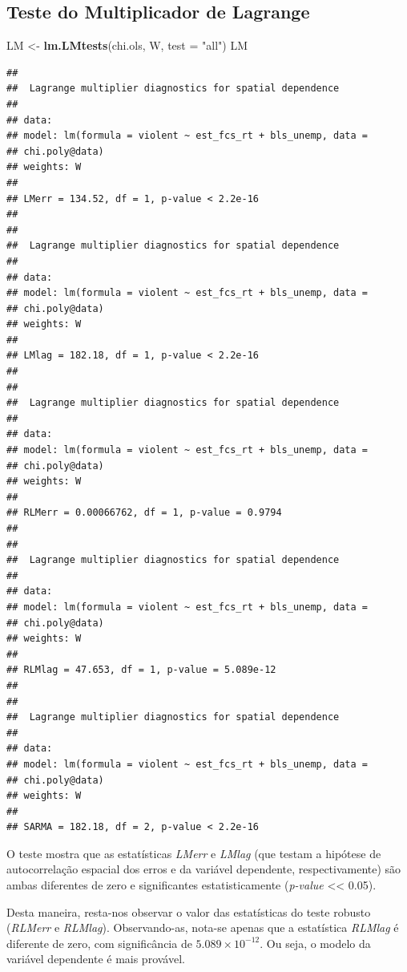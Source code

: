 \documentclass[12pt,]{article}
\newenvironment{Shaded}{\begin{snugshade}}{\end{snugshade}}
\newcommand{\KeywordTok}[1]{\textcolor[rgb]{0.13,0.29,0.53}{\textbf{#1}}}
\newcommand{\DataTypeTok}[1]{\textcolor[rgb]{0.13,0.29,0.53}{#1}}
\newcommand{\StringTok}[1]{\textcolor[rgb]{0.31,0.60,0.02}{#1}}
\newcommand{\NormalTok}[1]{#1}
\begin{document}
\subsection{Teste do Multiplicador de
Lagrange}\label{teste-do-multiplicador-de-lagrange-1}

\begin{Shaded}
\begin{Highlighting}[]
\NormalTok{LM <-}\StringTok{ }\KeywordTok{lm.LMtests}\NormalTok{(chi.ols, W, }\DataTypeTok{test =} \StringTok{"all"}\NormalTok{)}
\NormalTok{LM}
\end{Highlighting}
\end{Shaded}

\begin{verbatim}
## 
##  Lagrange multiplier diagnostics for spatial dependence
## 
## data:  
## model: lm(formula = violent ~ est_fcs_rt + bls_unemp, data =
## chi.poly@data)
## weights: W
## 
## LMerr = 134.52, df = 1, p-value < 2.2e-16
## 
## 
##  Lagrange multiplier diagnostics for spatial dependence
## 
## data:  
## model: lm(formula = violent ~ est_fcs_rt + bls_unemp, data =
## chi.poly@data)
## weights: W
## 
## LMlag = 182.18, df = 1, p-value < 2.2e-16
## 
## 
##  Lagrange multiplier diagnostics for spatial dependence
## 
## data:  
## model: lm(formula = violent ~ est_fcs_rt + bls_unemp, data =
## chi.poly@data)
## weights: W
## 
## RLMerr = 0.00066762, df = 1, p-value = 0.9794
## 
## 
##  Lagrange multiplier diagnostics for spatial dependence
## 
## data:  
## model: lm(formula = violent ~ est_fcs_rt + bls_unemp, data =
## chi.poly@data)
## weights: W
## 
## RLMlag = 47.653, df = 1, p-value = 5.089e-12
## 
## 
##  Lagrange multiplier diagnostics for spatial dependence
## 
## data:  
## model: lm(formula = violent ~ est_fcs_rt + bls_unemp, data =
## chi.poly@data)
## weights: W
## 
## SARMA = 182.18, df = 2, p-value < 2.2e-16
\end{verbatim}

O teste mostra que as estatísticas \emph{LMerr} e \emph{LMlag} (que
testam a hipótese de autocorrelação espacial dos erros e da variável
dependente, respectivamente) são ambas diferentes de zero e
significantes estatisticamente (\emph{p-value} \textless{}\textless{}
0.05).

Desta maneira, resta-nos observar o valor das estatísticas do teste
robusto (\emph{RLMerr} e \emph{RLMlag}). Observando-as, nota-se apenas
que a estatística \emph{RLMlag} é diferente de zero, com significância
de \(5.089\times 10^{-12}\). Ou seja, o modelo da variável dependente é
mais provável.
\end{document}
